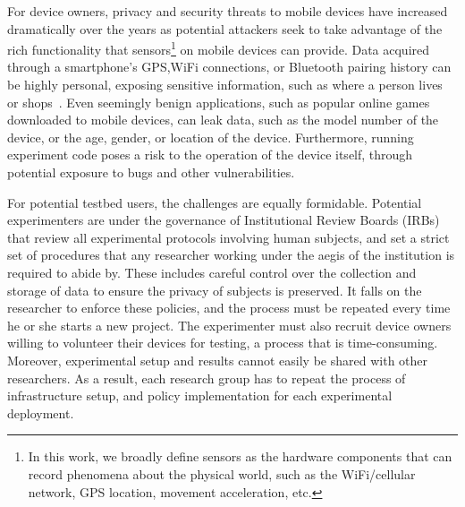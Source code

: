 For device owners, privacy and security threats to mobile devices have
increased dramatically over the years as potential attackers seek
to take advantage of the rich functionality that %
sensors\footnote{\scriptsize In this work, we broadly define sensors
as the hardware components that can record phenomena about the
physical world, such as the WiFi/cellular network, GPS location,
movement acceleration, etc.} on mobile devices can provide.
Data acquired through a smartphone's GPS,WiFi
connections, or Bluetooth pairing history can be highly personal,
exposing sensitive information, such as where a person lives or 
shops~\cite{han2012accomplice}. Even seemingly benign applications, 
such as popular online games downloaded to mobile devices, can
leak data, such as the model number of the device, or the age, gender, 
or location of the device. Furthermore, running experiment code poses 
a risk to the operation of the device itself, through potential exposure 
to bugs and other vulnerabilities. 

For potential testbed users, the challenges are equally formidable. 
Potential experimenters are under the governance of Institutional 
Review Boards (IRBs)~\cite{irb} that
review all experimental protocols involving human subjects,
and set a strict set of procedures that any researcher working under
the aegis of the institution is required to abide by. These includes
careful control over the collection and storage of data to ensure the 
privacy of subjects is preserved. It falls on the researcher to enforce 
these policies, and the process must be repeated every time he or 
she starts a new project. The experimenter must also recruit device 
owners willing to volunteer their devices for testing, a process that 
is time-consuming. Moreover, experimental setup and results cannot 
easily be shared with other researchers. As a result, each research 
group has to repeat the process of infrastructure setup, and policy 
implementation for each experimental deployment.

